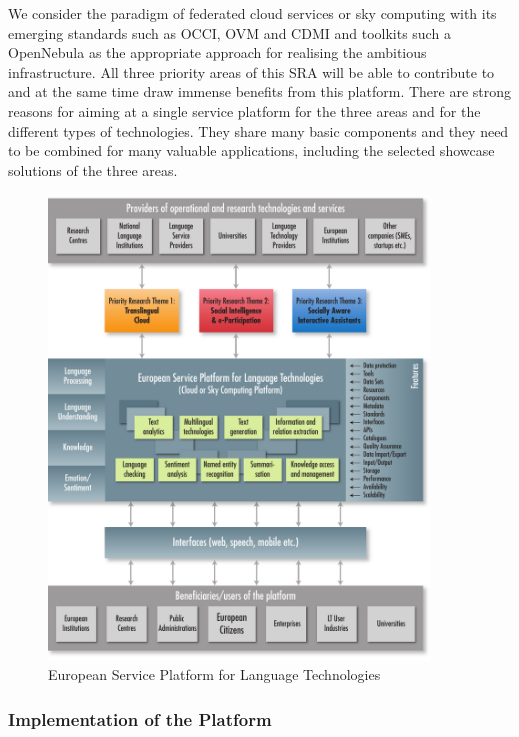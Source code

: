 \documentclass[10pt, plain]{../../metanetpaper}
\begin{document}
\begin{multicols}{2}
We consider the paradigm of federated cloud services or sky computing with its emerging standards such as OCCI, OVM and CDMI and toolkits such a OpenNebula as the appropriate approach for realising the ambitious infrastructure. All three priority areas of this SRA will be able to contribute to and at the same time draw immense benefits from this platform. There are strong reasons for aiming at a single service platform for the three areas and for the different types of technologies. They share many basic components and they need to be combined for many valuable applications, including the selected showcase solutions of the three areas.

\begin{figure}[htbp]
  \center
  \includegraphics[width=0.9\textwidth]{../_media/Platform}
  \caption{European Service Platform for Language Technologies}
  \label{fig:platform-overview}
\end{figure}

 
\subsubsection*{Implementation of the Platform}
\label{sec:implementation-of-platform}


\end{multicols}
\end{document}
